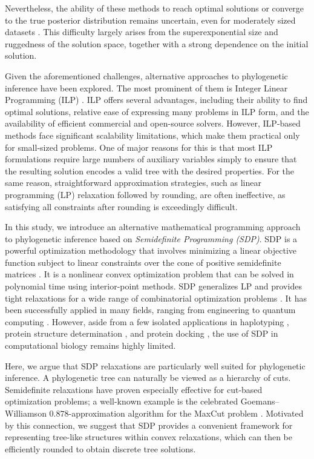 \documentclass{article}
\begin{document}
Nevertheless, the ability of these methods to reach optimal solutions or converge to the true posterior distribution remains uncertain, even for moderately sized datasets \cite{spirin2024phylobench,zhou2018evaluating,liu2024influence,fabreti2022convergence}. This difficulty largely arises from the superexponential size and ruggedness of the solution space, together with a strong dependence on the initial solution. 

Given the aforementioned challenges, alternative approaches to phylogenetic inference have been explored. The most prominent of them is Integer Linear Programming (ILP) \cite{gusfield2019integer}. ILP offers several advantages, including their ability to find optimal solutions, relative ease of expressing many problems in ILP form, and the availability of efficient commercial and open-source solvers. However, ILP-based methods face significant scalability limitations, which make them practical only for small-sized problems. One of major reasons for this is that most ILP formulations require large numbers of auxiliary variables simply to ensure that the resulting solution encodes a valid tree with the desired properties. For the same reason, straightforward approximation strategies, such as linear programming (LP) relaxation followed by rounding, are often ineffective, as satisfying all constraints after rounding is exceedingly difficult.

In this study, we introduce an alternative mathematical programming approach to phylogenetic inference based on {\it Semidefinite Programming (SDP)}. SDP is a powerful optimization methodology that involves minimizing a linear objective function subject to linear constraints over the cone of positive semidefinite matrices \cite{vandenberghe1996semidefinite}. It is a nonlinear convex optimization problem that can be solved in polynomial time using interior-point methods. SDP generalizes LP and provides tight relaxations for a wide range of combinatorial optimization problems \cite{lovasz2003semidefinite}. It has been successfully applied in many fields, ranging from engineering \cite{wolkowicz2012handbook} to quantum computing \cite{skrzypczyk2023semidefinite}. However, aside from a few isolated applications in haplotyping \cite{kalpakis2005haplotype}, protein structure determination \cite{alipanahi2013determining}, and protein docking \cite{marcia2007global}, the use of SDP in computational biology remains highly limited.

Here, we argue that SDP relaxations are particularly well suited for phylogenetic inference. A phylogenetic tree can naturally be viewed as a hierarchy of cuts. Semidefinite relaxations have proven especially effective for cut-based optimization problems; a well-known example is the celebrated Goemans–Williamson $0.878$-approximation algorithm for the MaxCut problem \cite{goemans1995improved}. Motivated by this connection, we suggest that SDP provides a convenient framework for representing tree-like structures within convex relaxations, which can then be efficiently rounded to obtain discrete tree solutions. 
\end{document}
